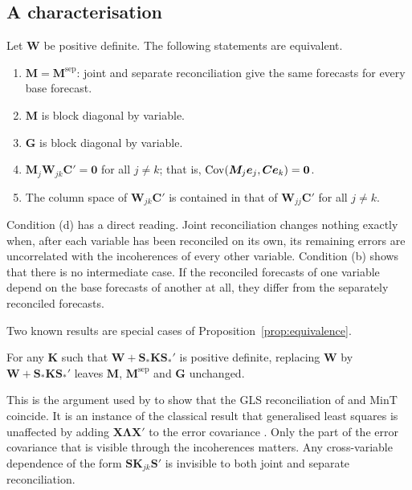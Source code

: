 \subsection{A characterisation}

\begin{proposition}\label{prop:equivalence}
Let $\bm{W}$ be positive definite. The following statements are equivalent.
\begin{enumerate}
  \item[(a)] $\bm{M} = \bm{M}^{\mathrm{sep}}$: joint and separate reconciliation give the same forecasts for every base forecast.
  \item[(b)] $\bm{M}$ is block diagonal by variable.
  \item[(c)] $\bm{G}$ is block diagonal by variable.
  \item[(d)] $\bm{M}_j\bm{W}_{jk}\bm{C}' = \bm{0}$ for all $j \ne k$; that is, $\operatorname{Cov}(\bm{M}_j\bm{e}_j, \bm{C}\bm{e}_k) = \bm{0}$.
  \item[(e)] The column space of $\bm{W}_{jk}\bm{C}'$ is contained in that of $\bm{W}_{jj}\bm{C}'$ for all $j \ne k$.
\end{enumerate}
\end{proposition}

Condition (d) has a direct reading. Joint reconciliation changes nothing exactly when, after each variable has been reconciled on its own, its remaining errors are uncorrelated with the incoherences of every other variable. Condition (b) shows that there is no intermediate case. If the reconciled forecasts of one variable depend on the base forecasts of another at all, they differ from the separately reconciled forecasts.

Two known results are special cases of Proposition~\ref{prop:equivalence}.

\begin{corollary}[Invariance]\label{cor:invariance}
For any $\bm{K}$ such that $\bm{W} + \bm{S}_*\bm{K}\bm{S}_*'$ is positive definite, replacing $\bm{W}$ by $\bm{W} + \bm{S}_*\bm{K}\bm{S}_*'$ leaves $\bm{M}$, $\bm{M}^{\mathrm{sep}}$ and $\bm{G}$ unchanged.
\end{corollary}

This is the argument used by \citet[Proposition 1]{wickramasuriya2021properties} to show that the GLS reconciliation of \citet{hyndman2011optimal} and MinT coincide. It is an instance of the classical result that generalised least squares is unaffected by adding $\bm{X}\bm{\Lambda}\bm{X}'$ to the error covariance \citep{rao1967least,zyskind1967canonical}. Only the part of the error covariance that is visible through the incoherences matters. Any cross-variable dependence of the form $\bm{S}\bm{K}_{jk}\bm{S}'$ is invisible to both joint and separate reconciliation.

